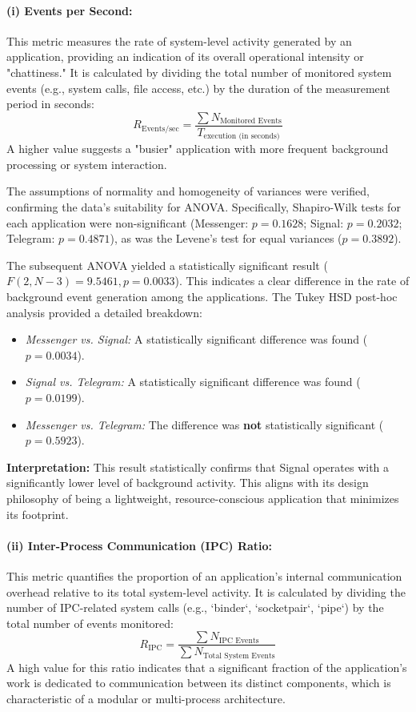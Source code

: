 \documentclass[a4paper,12pt]{report}
\begin{document}
\paragraph{(i) Events per Second:}
This metric measures the rate of system-level activity generated by an application, providing an indication of its overall operational intensity or "chattiness." It is calculated by dividing the total number of monitored system events (e.g., system calls, file access, etc.) by the duration of the measurement period in seconds:
$$
R_{\text{Events/sec}} = \frac{\sum N_{\text{Monitored Events}}}{T_{\text{execution (in seconds)}}}
$$
A higher value suggests a "busier" application with more frequent background processing or system interaction.

The assumptions of normality and homogeneity of variances were verified, confirming the data's suitability for ANOVA. Specifically, Shapiro-Wilk tests for each application were non-significant (Messenger: $p=0.1628$; Signal: $p=0.2032$; Telegram: $p=0.4871$), as was the Levene's test for equal variances ($p=0.3892$).

The subsequent ANOVA yielded a statistically significant result ($F(2, N-3) = 9.5461, p = 0.0033$). This indicates a clear difference in the rate of background event generation among the applications. The Tukey HSD post-hoc analysis provided a detailed breakdown:
\begin{itemize}
    \item \textit{Messenger vs. Signal:} A statistically significant difference was found ($p=0.0034$).
    \item \textit{Signal vs. Telegram:} A statistically significant difference was found ($p=0.0199$).
    \item \textit{Messenger vs. Telegram:} The difference was \textbf{not} statistically significant ($p=0.5923$).
\end{itemize}


\textbf{Interpretation:} This result statistically confirms that Signal operates with a significantly lower level of background activity. This aligns with its design philosophy of being a lightweight, resource-conscious application that minimizes its footprint.

\paragraph{(ii) Inter-Process Communication (IPC) Ratio:}
This metric quantifies the proportion of an application's internal communication overhead relative to its total system-level activity. It is calculated by dividing the number of IPC-related system calls (e.g., `binder`, `socketpair`, `pipe`) by the total number of events monitored:
$$R_{\text{IPC}} = \frac{\sum N_{\text{IPC Events}}}{\sum N_{\text{Total System Events}}}$$
A high value for this ratio indicates that a significant fraction of the application's work is dedicated to communication between its distinct components, which is characteristic of a modular or multi-process architecture.
\end{document}
